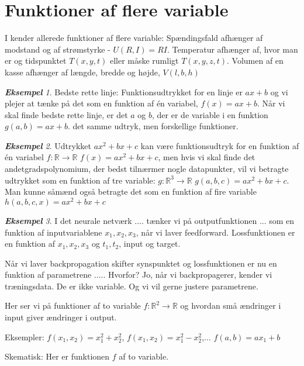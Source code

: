 \documentclass[a4paper, 12pt]{article}
\theoremstyle{remark}
\newtheorem{Eksempel}{\textbf{Eksempel}}
\begin{document}
\section*{Funktioner af flere variable}

I kender allerede funktioner af flere variable: Spændingsfald afhænger af modstand og af strømstyrke - $U(R,I)=RI$. Temperatur afhænger af, hvor man er og tidspunktet $T(x,y,t)$ eller måske rumligt $T(x,y,z,t)$. Volumen af en kasse afhænger af længde, bredde og højde, $V(l,b,h)$

\begin{Eksempel} Bedste rette linje: Funktionsudtrykket for en linje er $ax+b$ og vi plejer at tænke på det som en funktion af én variabel, $f(x)=ax+b$. Når vi skal finde bedste rette linje, er det $a$ og $b$, der er de variable i en funktion $g(a,b)= ax+b$. det samme udtryk, men forskellige funktioner. 
\end{Eksempel}

\begin{Eksempel} Udtrykket $ax^2+bx+c$ kan være funktionsudtryk for en funktion af én variabel $f:\mathbb{R}\to \mathbb{R}$ $f(x)=ax^2+bx+c$, men hvis vi skal finde det andetgradspolynomium, der bedst tilnærmer nogle datapunkter, vil vi betragte udtrykket som en funktion af tre variable: $g:\mathbb{R}^3\to\mathbb{R}$ $g(a,b,c)=ax^2+bx+c$. Man kunne såmænd også betragte det som en funktion af fire variable $h(a,b,c,x)= ax^2+bx+c$

\end{Eksempel}
\begin{Eksempel} I det neurale netværk .... tænker vi på   outputfunktionen ... som en funktion af inputvariablene $x_1,x_2,x_3$, når vi laver feedforward. Lossfunktionen er en funktion af $x_1,x_2,x_3$ og $t_1,t_2$, input og target.

Når vi laver backpropagation skifter synspunktet og lossfunktionen er nu en funktion af parametrene ..... Hvorfor? Jo, når vi backpropagerer, kender vi træningsdata. De er ikke variable. Og vi vil gerne justere parametrene. 
\end{Eksempel}


Her ser vi på funktioner af to variable $f: \mathbb{R}^2\to \mathbb{R}$ og hvordan små ændringer i input giver ændringer i output.

Eksempler: $f(x_1,x_2)=x_1^2+x_2^2$, $f(x_1,x_2)=x_1^2-x_2^2$,... $f(a,b)=ax_1+b$ 

Skematisk: Her er funktionen $f$ af to variable.\\
\end{document}
